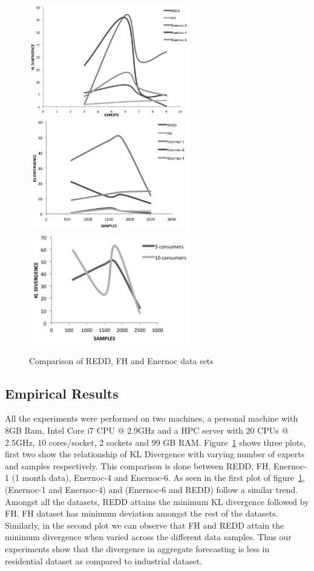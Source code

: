 \documentclass{acm_proc_article-sp}
\begin{document}
\begin{figure}
\centering
\includegraphics[width=7cm]{./plot4.jpg}
\includegraphics[width=7cm]{./plot5.jpg}
\includegraphics[width=7cm]{./plot3.jpg}
\caption{Comparison of REDD, FH and Enernoc data sets}
\label{fig:plots}
\end{figure}


\subsection{Empirical Results}
All the experiments were performed on two machines, a personal machine with 8GB Ram, Intel Core i7 CPU @ 2.9GHz and a HPC server with 20 CPUs @ 2.5GHz, 10 cores/socket, 2 sockets and 99 GB RAM.  
Figure~\ref{fig:plots} shows three plots, first two show the relationship of KL Divergence with varying number of experts and samples respectively. This comparison is done between REDD, FH, Enernoc-1 (1 month data), Enernoc-4 and Enernoc-6. As seen in the first plot of figure~\ref{fig:plots}, (Enernoc-1 and Enernoc-4) and (Enernoc-6 and REDD) follow a similar trend. Amongst all the datasets, REDD attains the minimum KL divergence followed by FH. FH dataset has minimum deviation amongst the rest of the datasets. Similarly, in the second plot we can observe that FH and REDD attain the minimum divergence when varied across the different data samples. Thus our experiments show that the divergence in aggregate forecasting is less in residential dataset as compared to industrial dataset.\\
\end{document}
